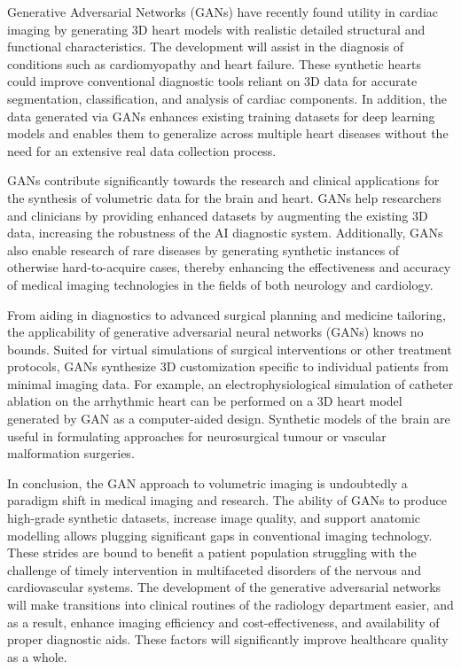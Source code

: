 \documentclass[12pt]{article}
\begin{document}
Generative Adversarial Networks (GANs) have recently found utility in cardiac imaging by generating 3D heart models with realistic detailed structural and functional characteristics. The development will assist in the diagnosis of conditions such as cardiomyopathy and heart failure. These synthetic hearts could improve conventional diagnostic tools reliant on 3D data for accurate segmentation, classification, and analysis of cardiac components. In addition, the data generated via GANs enhances existing training datasets for deep learning models and enables them to generalize across multiple heart diseases without the need for an extensive real data collection process.

GANs contribute significantly towards the research and clinical applications for the synthesis of volumetric data for the brain and heart. GANs help researchers and clinicians by providing enhanced datasets by augmenting the existing 3D data, increasing the robustness of the AI diagnostic system. Additionally, GANs also enable research of rare diseases by generating synthetic instances of otherwise hard-to-acquire cases, thereby enhancing the effectiveness and accuracy of medical imaging technologies in the fields of both neurology and cardiology.

From aiding in diagnostics to advanced surgical planning and medicine tailoring, the applicability of generative adversarial neural networks (GANs) knows no bounds. Suited for virtual simulations of surgical interventions or other treatment protocols, GANs synthesize 3D customization specific to individual patients from minimal imaging data. For example, an electrophysiological simulation of catheter ablation on the arrhythmic heart can be performed on a 3D heart model generated by GAN as a computer-aided design. Synthetic models of the brain are useful in formulating approaches for neurosurgical tumour or vascular malformation surgeries. 

In conclusion, the GAN approach to volumetric imaging is undoubtedly a paradigm shift in medical imaging and research. The ability of GANs to produce high-grade synthetic datasets, increase image quality, and support anatomic modelling allows plugging significant gaps in conventional imaging technology. These strides are bound to benefit a patient population struggling with the challenge of timely intervention in multifaceted disorders of the nervous and cardiovascular systems. The development of the generative adversarial networks will make transitions into clinical routines of the radiology department easier, and as a result, enhance imaging efficiency and cost-effectiveness, and availability of proper diagnostic aids. These factors will significantly improve healthcare quality as a whole.
\end{document}
